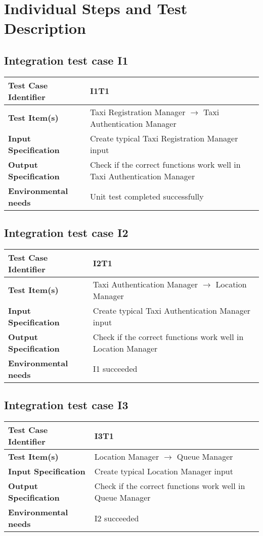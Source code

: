 \section{Individual Steps and Test Description}
\subsection{Integration test case I1}
\begin{tabular} {l p{9cm}}
	\hline \textbf{Test Case Identifier} & I1T1 \\
	\hline \textbf{Test Item(s)} & Taxi Registration Manager $\rightarrow$ Taxi Authentication Manager  \\
	\hline \textbf{Input Specification} & Create typical Taxi Registration Manager input \\
	\hline \textbf{Output Specification} & Check if the correct functions work well in Taxi Authentication Manager \\
	\hline \textbf{Environmental needs} & Unit test completed successfully \\
	\hline 
\end{tabular}
\subsection{Integration test case I2}
\begin{tabular} {l p{9cm}}
	\hline \textbf{Test Case Identifier} & I2T1 \\
	\hline \textbf{Test Item(s)} & Taxi Authentication Manager $\rightarrow$ Location Manager \\
	\hline \textbf{Input Specification} & Create typical Taxi Authentication Manager input \\
	\hline \textbf{Output Specification} & Check if the correct functions work well in Location Manager \\
	\hline \textbf{Environmental needs} & I1 succeeded \\
	\hline 
\end{tabular}
\subsection{Integration test case I3}
\begin{tabular} {l p{9cm}}
	\hline \textbf{Test Case Identifier} & I3T1 \\
	\hline \textbf{Test Item(s)} & Location Manager $\rightarrow$ Queue Manager \\
	\hline \textbf{Input Specification} & Create typical Location Manager input \\
	\hline \textbf{Output Specification} & Check if the correct functions work well in Queue Manager \\
	\hline \textbf{Environmental needs} & I2 succeeded \\
	\hline 
\end{tabular}
